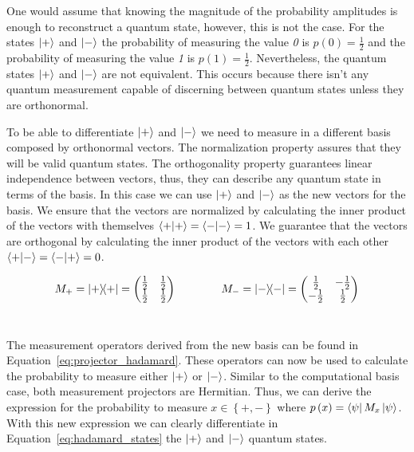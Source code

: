 One would assume that knowing the magnitude of the probability amplitudes
is enough to reconstruct a quantum state, however, this is not the case.
For the states \(\ket{+}\) and \(\ket{-}\) the probability of measuring
the value \textit{0} is \(p\left(0\right) = \frac{1}{2}\) and the probability
of measuring the value \textit{1} is \(p\left(1\right) = \frac{1}{2}\).
Nevertheless, the quantum states \(\ket{+}\) and \(\ket{-}\) are not
equivalent. This occurs because there isn't any quantum measurement capable
of discerning between quantum states unless they are orthonormal.\

To be able to differentiate \(\ket{+}\) and \(\ket{-}\) we
need to measure in a different basis composed by orthonormal vectors.
The normalization property assures that they will be valid quantum states.
The orthogonality property guarantees linear independence between vectors,
thus, they can describe any quantum state in terms of the basis. In
this case we can use \(\ket{+}\) and \(\ket{-}\) as the new vectors for
the basis. We ensure that the vectors are normalized by calculating the
inner product of the vectors with themselves \(\braket{+}{+}=\braket{-}{-}=1\).
We guarantee that the vectors are orthogonal by calculating the
inner product of the vectors with each other \(\braket{+}{-}=\braket{-}{+}=0\). \

\begin{equation}\label{eq:projector_hadamard}
  M_+ = \ketbra{+}{+} = \begin{pmatrix}
                          \frac{1}{2} & \frac{1}{2} \\
                          \frac{1}{2} & \frac{1}{2}
                        \end{pmatrix} \qquad \qquad
  M_- = \ketbra{-}{-} = \begin{pmatrix}
                          \frac{1}{2} & -\frac{1}{2} \\
                          -\frac{1}{2} & \frac{1}{2}
                        \end{pmatrix}
\end{equation} \

The measurement operators derived from the new basis can be found
in Equation~\ref{eq:projector_hadamard}. These operators can now
be used to calculate the probability to measure either \(\ket{+}\)
or \(\ket{-}\). Similar to the computational basis case, both
measurement projectors are Hermitian. Thus, we can derive the
expression for the probability to measure \(x \in \left\{+,-\right\}\)
where \(p\left(x\right) = \bra{\psi}M_x\ket{\psi}\). With this new
expression we can clearly differentiate in Equation~\ref{eq:hadamard_states}
the \(\ket{+}\) and \(\ket{-}\) quantum states. \


